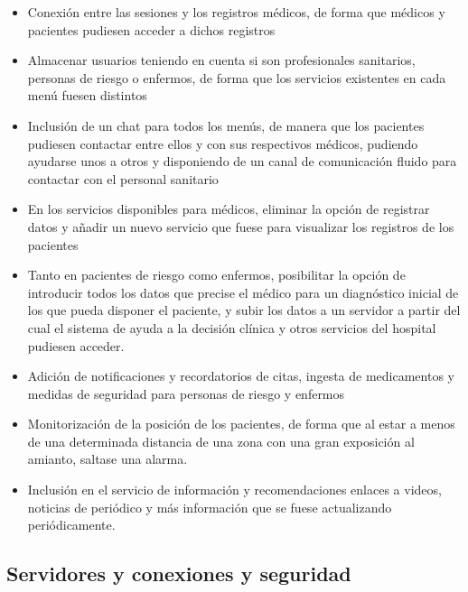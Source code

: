 \documentclass{article}
\begin{document}
\begin{itemize}
\item
Conexión entre las sesiones y los registros médicos, de forma que
médicos y pacientes pudiesen acceder a dichos registros

\item
Almacenar usuarios teniendo en cuenta si son profesionales sanitarios,
personas de riesgo o enfermos, de forma que los servicios existentes
en cada menú fuesen distintos

\item
Inclusión de un chat para todos los menús, de manera que los pacientes
pudiesen contactar entre ellos y con sus respectivos médicos, pudiendo
ayudarse unos a otros y disponiendo de un canal de comunicación fluido
para contactar con el personal sanitario

\item
En los servicios disponibles para médicos, eliminar la opción de
registrar datos y añadir un nuevo servicio que fuese para visualizar
los registros de los pacientes

\item
Tanto en pacientes de riesgo como enfermos, posibilitar la opción de
introducir todos los datos que precise el médico para un diagnóstico
inicial de los que pueda disponer el paciente, y subir los datos a un
servidor a partir del cual el sistema de ayuda a la decisión clínica y
otros servicios del hospital pudiesen acceder.

\item
Adición de notificaciones y recordatorios de citas, ingesta de
medicamentos y medidas de seguridad para personas de riesgo y enfermos

\item
Monitorización de la posición de los pacientes, de forma que al estar
a menos de una determinada distancia de una zona con una gran
exposición al amianto, saltase una alarma.

\item
Inclusión en el servicio de información y recomendaciones enlaces a
videos, noticias de periódico y más información que se fuese
actualizando periódicamente.
\end{itemize}


\subsection{Servidores y conexiones y seguridad}
\end{document}
